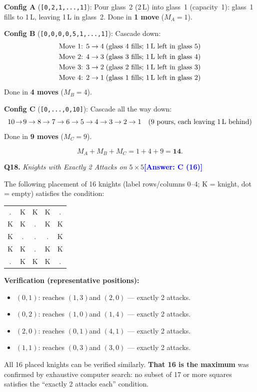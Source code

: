 \documentclass[a4paper,12pt]{article}
\newcommand{\ans}[1]{\textcolor{blue}{\textbf{[Answer: #1]}}}
\newcommand{\qsol}[3]{%
  \vspace{1.5ex}%
  \noindent\textbf{Q#1.} \textit{#2}\quad\ans{#3}%
  \par\vspace{0.4ex}%
}
\begin{document}
\textbf{Config A} (\texttt{[0,2,1,...,1]}): Pour glass~2 (2\,L) into
glass~1 (capacity~1): glass~1 fills to 1\,L, leaving 1\,L in glass~2.
Done in \textbf{1 move} ($M_A = 1$).

\textbf{Config B} (\texttt{[0,0,0,0,5,1,...,1]}): Cascade down:
\begin{align*}
  &\text{Move 1: } 5\to4 \;\text{(glass~4 fills; 1\,L left in glass~5)}\\
  &\text{Move 2: } 4\to3 \;\text{(glass~3 fills; 1\,L left in glass~4)}\\
  &\text{Move 3: } 3\to2 \;\text{(glass~2 fills; 1\,L left in glass~3)}\\
  &\text{Move 4: } 2\to1 \;\text{(glass~1 fills; 1\,L left in glass~2)}
\end{align*}
Done in \textbf{4 moves} ($M_B = 4$).

\textbf{Config C} (\texttt{[0,...,0,10]}): Cascade all the way down:
\[
  10\!\to\!9 \to 8 \to 7 \to 6 \to 5 \to 4 \to 3 \to 2 \to 1
  \quad\text{(9 pours, each leaving 1\,L behind)}
\]
Done in \textbf{9 moves} ($M_C = 9$).

\[
  M_A + M_B + M_C = 1 + 4 + 9 = \mathbf{14}.
\]

\qsol{18}{Knights with Exactly 2 Attacks on $5{\times}5$}{C (16)}

The following placement of 16 knights (label rows/columns 0--4;
K = knight, dot = empty) satisfies the condition:

\begin{center}
\ttfamily
\begin{tabular}{ccccc}
. & K & K & K & . \\
K & K & . & K & K \\
K & . & . & . & K \\
K & K & . & K & K \\
. & K & K & K & . \\
\end{tabular}
\end{center}

\textbf{Verification (representative positions):}
\begin{itemize}[nosep]
  \item $(0,1)$: reaches $(1,3)$\checkmark and $(2,0)$\checkmark
        --- exactly 2 attacks.
  \item $(0,2)$: reaches $(1,0)$\checkmark and $(1,4)$\checkmark
        --- exactly 2 attacks.
  \item $(2,0)$: reaches $(0,1)$\checkmark and $(4,1)$\checkmark
        --- exactly 2 attacks.
  \item $(1,1)$: reaches $(0,3)$\checkmark and $(3,0)$\checkmark
        --- exactly 2 attacks.
\end{itemize}
All 16 placed knights can be verified similarly. \textbf{That 16 is the
maximum} was confirmed by exhaustive computer search: no subset of 17 or more
squares satisfies the ``exactly 2 attacks each'' condition.
\end{document}
